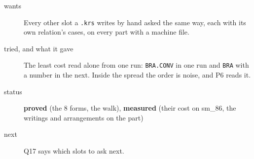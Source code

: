 \begin{description}
\item[{wants}] Every other slot a \texttt{.\allowbreak{}krs} writes by hand asked the same way, each with its own relation's cases, on every part with a machine file.
\item[{tried, and what it gave}] The least cost read alone from one run: \texttt{BRA.\allowbreak{}CONV} in one run and \texttt{BRA} with a number in the next. Inside the spread the order is noise, and P6 reads it.
\item[{status}] \textbf{proved} (the 8 forms, the walk), \textbf{measured} (their cost on sm\_\allowbreak{}86, the writings and arrangements on the part)
\item[{next}] Q17 says which slots to ask next.
\end{description}

